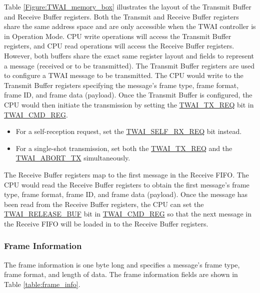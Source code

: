 \documentclass[main\_\_EN.tex]{subfiles}
\begin{document}
Table \ref{Figure:TWAI_memory_box} illustrates the layout of the Transmit Buffer and Receive Buffer registers. Both the Transmit and Receive Buffer registers share the same address space and are only accessible when the TWAI controller is in Operation Mode. CPU write operations will access the Transmit Buffer registers, and CPU read operations will access the Receive Buffer registers. However, both buffers share the exact same register layout and fields to represent a message (received or to be transmitted).
The Transmit Buffer registers are used to configure a TWAI message to be transmitted. The CPU would write to the Transmit Buffer registers specifying the message’s frame type, frame format, frame ID, and frame data (payload). Once the Transmit Buffer is configured, the CPU would then initiate the transmission by setting the  \hyperref[fielddesc:TWAITXREQ]{TWAI\_TX\_REQ} bit in \hyperref[regdesc:TWAICMDREG]{TWAI\_CMD\_REG}.

\begin{itemize}
    \item For a self-reception request, set the \hyperref[fielddesc:TWAISELFRXREQ]{TWAI\_SELF\_RX\_REQ} bit instead.
    \item For a single-shot transmission, set both the \hyperref[fielddesc:TWAITXREQ]{TWAI\_TX\_REQ} and the \hyperref[fielddesc:TWAIABORTTX]{TWAI\_ABORT\_TX} simultaneously.
\end{itemize}

The Receive Buffer registers map to the first message in the Receive FIFO. The CPU would read the Receive Buffer registers to obtain the first message’s frame type, frame format, frame ID, and frame data (payload). Once the message has been read from the Receive Buffer registers, the CPU can set the \hyperref[fielddesc:TWAIRELEASEBUF]{TWAI\_RELEASE\_BUF} bit in \hyperref[regdesc:TWAICMDREG]{TWAI\_CMD\_REG} so that the next message in the Receive FIFO will be loaded in to the Receive Buffer
registers.


\subsubsection{Frame Information}
The frame information is one byte long and specifies a message’s frame type, frame format, and length of data. The frame information fields are shown in Table \ref{table:frame_info}.
\end{document}
